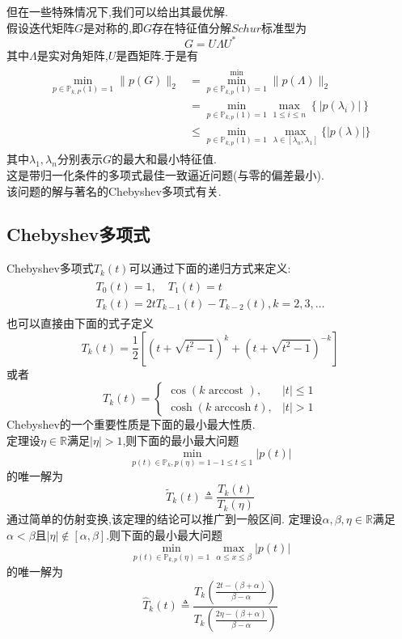 \documentclass[12pt,a4paper]{article}
\begin{document}
但在一些特殊情况下,我们可以给出其最优解.\\
假设迭代矩阵$G$是对称的,即$G$存在特征值分解$Schur$标准型为
$$
G=U \Lambda U^{*}
$$
其中$\Lambda$是实对角矩阵,$U$是酉矩阵.于是有
\begin{align*}
\begin{array}{ll}
\min _{p \in \mathbb{P}_{k, P}(1)=1}\|p(G)\|_{2}&{=\min _{p \in \mathbb{P}_{k, p}(1)=1}^{\min }\|p(\Lambda)\|_{2}} \\ {}&{=\min _{p \in \mathbb{P}_{k, p}(1)=1} \max _{1 \leq i \leq n}\left\{\left|p\left(\lambda_{i}\right)\right|\right\}} \\ {}&{ \leq \min _{p \in \mathbb{P}_{k, p}(1)=1} \max _{\lambda \in\left[\lambda_{n}, \lambda_{1}\right]}\{|p(\lambda)|\}}\end{array}
\tag{6.22}
\end{align*}
其中$\lambda_{1}, \lambda_{n}$分别表示$G$的最大和最小特征值.\\
这是带归一化条件的多项式最佳一致逼近问题(与零的偏差最小).\\
该问题的解与著名的{\color{blue}Chebyshev多项式}有关.\\
\subsection*{Chebyshev多项式}
Chebyshev多项式$T_{k}(t)$可以通过下面的递归方式来定义:
\begin{align*}
\begin{array}{l}{T_{0}(t)=1, \quad T_{1}(t)=t} \\ {T_{k}(t)=2 t T_{k-1}(t)-T_{k-2}(t), k=2,3, \ldots}\end{array}
\tag{6.23}
\end{align*}
也可以直接由下面的式子定义
$$
T_{k}(t)=\frac{1}{2}\left[\left(t+\sqrt{t^{2}-1}\right)^{k}+\left(t+\sqrt{t^{2}-1}\right)^{-k}\right]
$$
或者
$$
T_{k}(t)=\left\{\begin{array}{ll}{\cos (k \text { arccost }),} & {|t| \leq 1} \\ {\cosh (k \operatorname{arccosh} t),} & {|t|>1}\end{array}\right.
$$
Chebyshev的一个重要性质是下面的最小最大性质.\\
{\color{blue}定理}设$\eta \in \mathbb{R}$满足$|\eta|>1$,则下面的最小最大问题
$$
\min _{p(t) \in \mathbb{P}_{k}, p(\eta)=1-1 \leq t \leq 1}|p(t)|
$$
的唯一解为
$$
\tilde{T}_{k}(t) \triangleq \frac{T_{k}(t)}{T_{k}(\eta)}
$$
通过简单的仿射变换,该定理的结论可以推广到一般区间.
{\color{blue}定理}\qquad 设$\alpha, \beta, \eta \in \mathbb{R}$满足$\alpha<\beta$且$|\eta| \notin[\alpha, \beta]$.则下面的最小最大问题
$$
\min _{p(t) \in \mathbb{P}_{k, p}(\eta)=1} \max _{\alpha \leq x \leq \beta}|p(t)|
$$
的唯一解为
$$
\hat{T}_{k}(t) \triangleq \frac{T_{k}\left(\frac{2 t-(\beta+\alpha)}{\beta-\alpha}\right)}{T_{k}\left(\frac{2 \eta-(\beta+\alpha)}{\beta-\alpha}\right)}
$$
\end{document}
